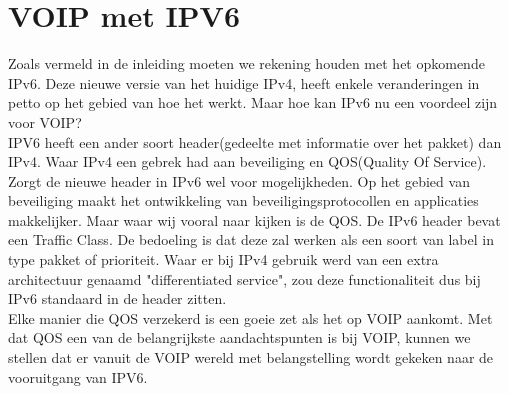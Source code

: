\documentclass[pdftex,a4paper,12pt,twoside]{report}
\begin{document}
\chapter{VOIP met IPV6}
\label{ch:VOIP met IPV6}
Zoals vermeld in de inleiding moeten we rekening houden met het opkomende IPv6. Deze nieuwe versie van het huidige IPv4, heeft enkele veranderingen in petto op het gebied van hoe het werkt. Maar hoe kan IPv6 nu een voordeel zijn voor VOIP?\\
IPV6 heeft een ander soort header(gedeelte met informatie over het pakket) dan IPv4. Waar IPv4 een gebrek had aan beveiliging en QOS(Quality Of Service). Zorgt de nieuwe header in IPv6 wel voor mogelijkheden. Op het gebied van beveiliging maakt het ontwikkeling van beveiligingsprotocollen en applicaties makkelijker. Maar waar wij vooral naar kijken is de QOS. De IPv6 header bevat een Traffic Class. De bedoeling is dat deze zal werken als een soort van label in type pakket of prioriteit. Waar er bij IPv4 gebruik werd van een extra architectuur genaamd "differentiated service", zou deze functionaliteit dus bij IPv6 standaard in de header zitten.\\
Elke manier die QOS verzekerd is een goeie zet als het op VOIP aankomt. Met dat QOS een van de belangrijkste aandachtspunten is bij VOIP, kunnen we stellen dat er vanuit de VOIP wereld met belangstelling wordt gekeken naar de vooruitgang van IPV6.
\end{document}
